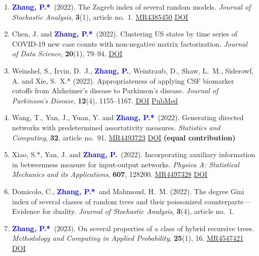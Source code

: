 \documentclass[12pt]{article}
\def\MR#1{\href{http://www.ams.org/mathscinet-getitem?mr=#1}{MR#1}}
\newcommand{\PZ}{\textbf{\textcolor{blue}{Zhang, P.*}}}
\newcommand{\PZnot}{\textbf{\textcolor{blue}{Zhang, P.}}}
\begin{document}
\begin{enumerate}
		\item \PZ\ (2022). The Zagreb index of several random models. {\em Journal of Stochastic Analysis}, {\bf 3}(1), article no.\ 1. \MR{4385450}
		\href{https://doi.org/10.31390/josa.3.1.01}{\underline{DOI}}
		
		\item {\sc Chen, J.} and \PZ\ (2022). Clustering US states by time series of COVID-19 new case counts with non-negative matrix	factorization. {\em Journal of Data Science}, {\bf 20}(1), 79--94.
		\href{https://doi.org/10.6339/22-JDS1036}{\underline{DOI}}
		
		\item {\sc Weinshel, S., Irvin, D.\ J.,} \PZnot, {\sc Weintraub, D., Shaw, L.\ M., Siderowf, A. and Xie, S.\ X.*} (2022). Appropriateness of applying CSF biomarker cutoffs from Alzheimer’s disease to Parkinson’s disease. {\em Journal of Parkinson's Disease}, {\bf 12}(4), 1155--1167. 
		\href{https://doi.org/10.3233/JPD-212989}{\underline{DOI}} 
		\href{https://pubmed.ncbi.nlm.nih.gov/35431261}
		{\underline{PubMed}}
		
		\item {\sc Wang, T., Yan, J., Yuan, Y.} and \PZ\ (2022). Generating directed networks with predetermined assortativity measures. {\em Statistics and Computing}, {\bf 32}, article no.\ 91. \MR{4493723}
		\href{https://doi.org/10.1007/s11222-022-10161-8}{\underline{DOI}} {\bf (equal contribution)}
		
		\item {\sc Xiao, S.*, Yan, J.} and \PZnot\ (2022). 
		Incorporating auxiliary information in betweenness measure for	input-output networks. {\em Physica A: Statistical Mechanics and its Applications}, {\bf 607}, 128200. \MR{4497328} \href{https://doi.org/10.1016/j.physa.2022.128200}{\underline{DOI}}
		
		\item {\sc Domicolo, C.,} \PZ\ and Mahmoud, H.\ M. (2022). 
		The degree Gini index of several classes of random trees and 
		their poissonized counterparts---Evidence for duality. {\em 
		Journal of Stochastic Analysis}, {\bf 3}(4), article no.\ 
		1.		
		
		\item \PZ\ (2023). On several properties of a class of 
		hybrid recursive trees. {\em Methodology and Computing in 
		Applied Probability}, {\bf 25}(1), 16. \MR{4547421} 
		\href{https://doi.org/10.1007/s11009-023-09988-z}{\underline{DOI}}
	\end{enumerate} 
	
\end{document}
